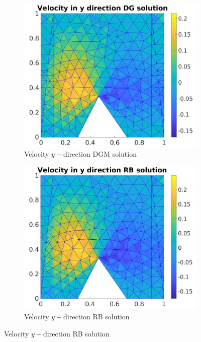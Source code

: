 \documentclass[graybox]{svmult}
\begin{document}
\begin{figure}[H]
\begin{subfigure}{0.31\textwidth}
\includegraphics[width=\linewidth]{offline_velocity_2_at_47_33.jpg}
\caption{Velocity $y-$direction DGM solution} \label{vel_y_dg}
\end{subfigure}\hspace*{\fill}
\begin{subfigure}{0.31\textwidth}
\includegraphics[width=\linewidth]{online_velocity_2_at_47_33.jpg}
\caption{Velocity $y-$direction RB solution} \label{vel_y_rb}
\end{subfigure}

\end{figure}
\end{document}

